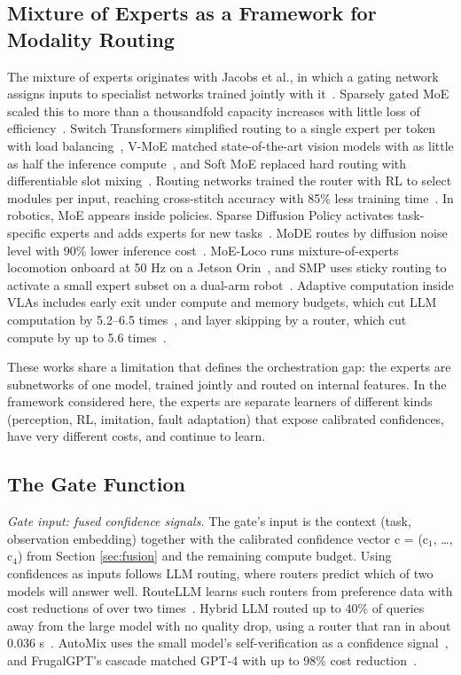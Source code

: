 \documentclass[journal]{IEEEtran}
\begin{document}
\subsection{Mixture of Experts as a Framework for Modality Routing}\label{sec:moe}
The mixture of experts originates with Jacobs et al., in which a gating network assigns inputs to specialist networks trained jointly with it~\cite{Jacobs1991}. Sparsely gated MoE scaled this to more than a thousandfold capacity increases with little loss of efficiency~\cite{Shazeer2017}. Switch Transformers simplified routing to a single expert per token with load balancing~\cite{Fedus2022}, V-MoE matched state-of-the-art vision models with as little as half the inference compute~\cite{Riquelme2021}, and Soft MoE replaced hard routing with differentiable slot mixing~\cite{Puigcerver2024}. Routing networks trained the router with RL to select modules per input, reaching cross-stitch accuracy with 85\% less training time~\cite{Rosenbaum2018}. In robotics, MoE appears inside policies. Sparse Diffusion Policy activates task-specific experts and adds experts for new tasks~\cite{Wang2024b}. MoDE routes by diffusion noise level with 90\% lower inference cost~\cite{Reuss2025}. MoE-Loco runs mixture-of-experts locomotion onboard at 50 Hz on a Jetson Orin~\cite{Huang2025}, and SMP uses sticky routing to activate a small expert subset on a dual-arm robot~\cite{SMP2026}. Adaptive computation inside VLAs includes early exit under compute and memory budgets, which cut LLM computation by 5.2--6.5 times~\cite{Yue2024}, and layer skipping by a router, which cut compute by up to 5.6 times~\cite{Zhang2026b}.

These works share a limitation that defines the orchestration gap: the experts are subnetworks of one model, trained jointly and routed on internal features. In the framework considered here, the experts are separate learners of different kinds (perception, RL, imitation, fault adaptation) that expose calibrated confidences, have very different costs, and continue to learn.


\subsection{The Gate Function}\label{sec:gate}
\textit{Gate input: fused confidence signals.} The gate's input is the context (task, observation embedding) together with the calibrated confidence vector c = (c\ensuremath{_1}, \ldots{}, c\ensuremath{_4}) from Section \ref{sec:fusion} and the remaining compute budget. Using confidences as inputs follows LLM routing, where routers predict which of two models will answer well. RouteLLM learns such routers from preference data with cost reductions of over two times~\cite{Ong2025}. Hybrid LLM routed up to 40\% of queries away from the large model with no quality drop, using a router that ran in about 0.036 s~\cite{Ding2024}. AutoMix uses the small model's self-verification as a confidence signal~\cite{Aggarwal2024}, and FrugalGPT's cascade matched GPT-4 with up to 98\% cost reduction~\cite{Chen2024}.
\end{document}
